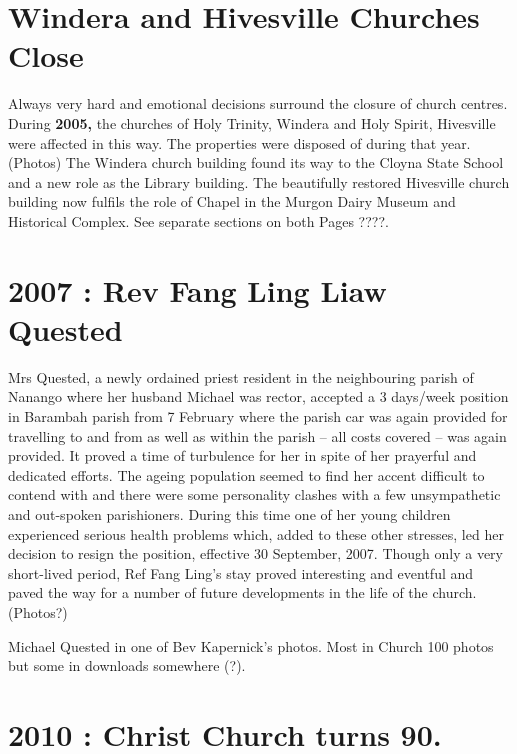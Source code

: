 \hypertarget{windera-and-hivesville-churches-close}{%
\section{Windera and Hivesville Churches
Close}\label{windera-and-hivesville-churches-close}}

Always very hard and emotional decisions surround the closure of church
centres. During \textbf{2005,} the churches of Holy Trinity, Windera and
Holy Spirit, Hivesville were affected in this way. The properties were
disposed of during that year. (Photos) The Windera church building found
its way to the Cloyna State School and a new role as the Library
building. The beautifully restored Hivesville church building now
fulfils the role of Chapel in the Murgon Dairy Museum and Historical
Complex. See separate sections on both Pages ????.

\hypertarget{rev-fang-ling-liaw-quested}{%
\section{2007 : Rev Fang Ling Liaw
Quested}\label{rev-fang-ling-liaw-quested}}

Mrs Quested, a newly ordained priest resident in the neighbouring parish
of Nanango where her husband Michael was rector, accepted a 3 days/week
position in Barambah parish from 7 February where the parish car was
again provided for travelling to and from as well as within the parish
-- all costs covered -- was again provided. It proved a time of
turbulence for her in spite of her prayerful and dedicated efforts. The
ageing population seemed to find her accent difficult to contend with
and there were some personality clashes with a few unsympathetic and
out-spoken parishioners. During this time one of her young children
experienced serious health problems which, added to these other
stresses, led her decision to resign the position, effective 30
September, 2007. Though only a very short-lived period, Ref Fang Ling's
stay proved interesting and eventful and paved the way for a number of
future developments in the life of the church. (Photos?)

Michael Quested in one of Bev Kapernick's photos. Most in Church 100
photos but some in downloads somewhere (?).

\hypertarget{christ-church-turns-90.}{%
\section{2010 : Christ Church turns 90.}\label{christ-church-turns-90.}}


